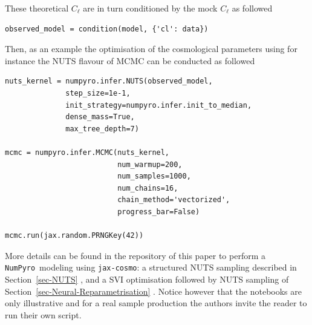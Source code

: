 \documentclass[twocolumn,twocolappendix,nofootinbib,iop]{openjournal}
\newcommand{\nblink}[1]{\href{https://github.com/DifferentiableUniverseInitiative/jax-cosmo-paper/blob/master/notebooks/#1.ipynb}{\faFileCodeO}}
\newcommand{\numpyro}{\texttt{NumPyro}}
\newcommand{\jaxcosmo}{\texttt{jax-cosmo}}
\begin{document}
These theoretical $C_{\ell}$ are in turn conditioned by the mock $C_\ell$ as followed
\begin{lstlisting}[language=iPython]
observed_model = condition(model, {'cl': data})
\end{lstlisting}
Then, as an example the optimisation of the cosmological parameters using for instance the NUTS flavour of MCMC can be conducted as followed
\begin{lstlisting}[language=iPython]
nuts_kernel = numpyro.infer.NUTS(observed_model,
              step_size=1e-1, 
              init_strategy=numpyro.infer.init_to_median,
              dense_mass=True,
              max_tree_depth=7)

mcmc = numpyro.infer.MCMC(nuts_kernel, 
                          num_warmup=200, 
                          num_samples=1000,
                          num_chains=16,
                          chain_method='vectorized',
                          progress_bar=False)

mcmc.run(jax.random.PRNGKey(42))
\end{lstlisting}
More details can be found in the repository of this paper to perform a \numpyro\ modeling using \jaxcosmo : a structured NUTS sampling described in Section~\ref{sec-NUTS} \nblink{VectorizedNumPyro_block}, and a SVI optimisation followed by NUTS sampling of Section~\ref{sec-Neural-Reparametrisation} \nblink{DESY_Y1_shear_cluster_ModelReparam_SVI-MVN_Neutra_NUTS}. Notice however that the notebooks are only illustrative and for a real sample production the authors invite the reader to run their own script.
% 
 
\typeout{}


\end{document}
